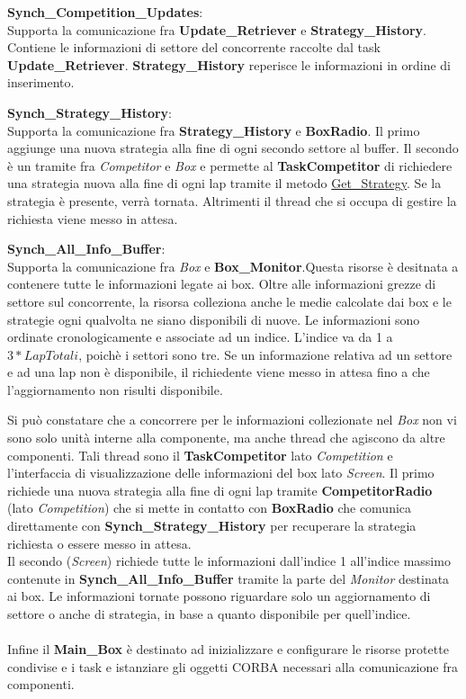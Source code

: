 \begin{description}
\item{\textbf{Synch\_Competition\_Updates}}:\\
Supporta la comunicazione fra \textbf{Update\_Retriever} e \textbf{Strategy\_History}. Contiene le informazioni di settore del 
concorrente raccolte dal task \textbf{Update\_Retriever}. \textbf{Strategy\_History} reperisce le informazioni in ordine
di inserimento.
\item{\textbf{Synch\_Strategy\_History}}:\\
Supporta la comunicazione fra \textbf{Strategy\_History} e \textbf{BoxRadio}. Il primo aggiunge una nuova strategia alla fine di ogni secondo settore
al buffer. Il secondo \`{e} un tramite fra \emph{Competitor} e \emph{Box} e permette al \textbf{TaskCompetitor} di richiedere una strategia
nuova alla fine di ogni lap tramite il metodo \underline{Get\_Strategy}. Se la strategia \`{e} presente, verr\`{a} tornata. 
Altrimenti il thread che si occupa di gestire la richiesta
viene messo in attesa.
\item{\textbf{Synch\_All\_Info\_Buffer}}:\\
Supporta la comunicazione fra \emph{Box} e \textbf{Box\_Monitor}.Questa risorse \`{e} desitnata a contenere tutte le informazioni legate ai box.
Oltre alle informazioni grezze di settore sul concorrente, la risorsa colleziona anche le medie calcolate
dai box e le strategie ogni qualvolta ne siano disponibili di nuove. Le informazioni sono ordinate cronologicamente e associate
ad un indice. L'indice va da 1 a $3 * Lap Totali$, poich\`{e} i settori sono tre. Se un informazione relativa ad un settore e ad una lap non
\`{e} disponibile, il richiedente viene messo in attesa fino a che l'aggiornamento non risulti disponibile.
\end{description}
Si pu\`{o} constatare che a concorrere per le informazioni collezionate nel \emph{Box} non vi sono solo unit\`{a} interne alla componente, ma anche
thread che agiscono da altre componenti. Tali thread sono il \textbf{TaskCompetitor} lato \emph{Competition} e l'interfaccia di visualizzazione
delle informazioni del box lato \emph{Screen}. Il primo richiede una nuova strategia alla fine di ogni lap tramite \textbf{CompetitorRadio} (lato
\emph{Competition}) che si mette in contatto con \textbf{BoxRadio} che comunica direttamente con \textbf{Synch\_Strategy\_History} per recuperare
la strategia richiesta o essere messo in attesa.\\
Il secondo (\emph{Screen}) richiede tutte le informazioni dall'indice 1 all'indice massimo contenute in \textbf{Synch\_All\_Info\_Buffer} tramite
la parte del \emph{Monitor} destinata ai box. Le informazioni tornate possono riguardare solo un aggiornamento di settore o anche di strategia,
in base a quanto disponibile per quell'indice.\\
\\
Infine il \textbf{Main\_Box} \`{e} destinato ad inizializzare e configurare le risorse protette condivise e i task e istanziare gli oggetti CORBA necessari 
alla comunicazione fra componenti.
\newpage
